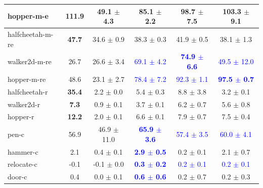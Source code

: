 \begin{table}[h]
\begin{small}
\begin{tabular}{lccccc}
        hopper-m-e & \textbf{111.9} &
                        49.1  $\pm$  4.3 &
                        85.1  $\pm$  2.2 &
                        98.7  $\pm$  7.5 &
                        103.3  $\pm$  9.1 \\
        \midrule
        halfcheetah-m-re & \textbf{47.7} &
                         34.6  $\pm$  0.9 &
                         38.3  $\pm$  0.3  &
                        41.9  $\pm$  0.5 &
                         38.1  $\pm$  1.3 \\
        walker2d-m-re & 26.7 &
                        26.6  $\pm$  3.4  &
                         \textcolor{blue}{69.1  $\pm$  4.2} &
                        \textcolor{blue}{\textbf{74.9  $\pm$  6.6}} &
                         \textcolor{blue}{49.5  $\pm$  12.0}  \\
        hopper-m-re & 48.6 &
                       23.1  $\pm$  2.7 &
                        \textcolor{blue}{78.4  $\pm$  7.2} &
                        \textcolor{blue}{92.3  $\pm$  1.1} &
                        \textcolor{blue}{\textbf{97.5  $\pm$  0.7}}\\
        \midrule
        halfcheetah-r & \textbf{35.4} &
                        2.2  $\pm$  0.0 &
                        5.4  $\pm$  0.3 &
                        8.8  $\pm$  3.8   &
                        3.2  $\pm$  0.1 \\
        walker2d-r & \textbf{7.3} &
                        0.9  $\pm$  0.1 &
                        3.7  $\pm$  0.1  &
                        6.2  $\pm$  0.7 &
                        5.6  $\pm$  0.8 \\
        hopper-r & \textbf{12.2} &
                        2.0  $\pm$  0.1 &
                        6.6  $\pm$  0.1 &
                        7.9  $\pm$  0.7 &
                        7.5  $\pm$  0.4  \\
        \midrule
        pen-c & 56.9 &
                    46.9  $\pm$  11.0 &
                    \textcolor{blue}{\textbf{65.9  $\pm$  3.6}} &
                    \textcolor{blue}{57.4  $\pm$  3.5} &
                    \textcolor{blue}{60.0  $\pm$  4.1} \\
        hammer-c & 2.1 &
                    0.4  $\pm$  0.1  &
                    \textcolor{blue}{\textbf{2.9  $\pm$  0.5 }} &
                    0.2  $\pm$  0.1 &
                    2.1  $\pm$  0.7  \\
        relocate-c & -0.1 &
                    -0.1  $\pm$  0.0 &
                    \textcolor{blue}{\textbf{0.3  $\pm$  0.2}} &
                    \textcolor{blue}{0.2  $\pm$  0.1} &
                    \textcolor{blue}{0.2  $\pm$  0.1}   \\
         door-c & 0.4 &
                    0.0  $\pm$  0.1 &
                    \textcolor{blue}{\textbf{0.6  $\pm$  0.6}} &
                    0.2  $\pm$  0.7 &
                    0.2  $\pm$  0.3 \\
        \bottomrule
    \end{tabular}
    \end{small}
    \label{tab:d4rl}
\end{table}

